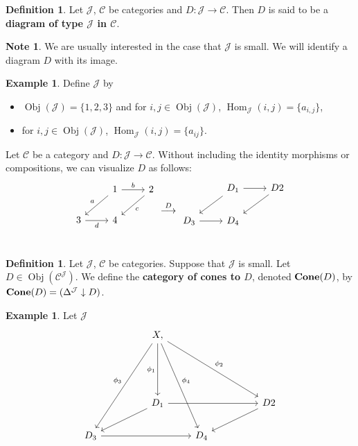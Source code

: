 \documentclass[12pt]{amsart}
\theoremstyle{definition}
\newtheorem{defn}[definition]{Definition}
\newtheorem{note}[definition]{Note}
\newtheorem{exmp}[definition]{Example}
\newcommand{\Del}{\Delta}
\newcommand{\MC}{\mathcal{C}}
\newcommand{\MJ}{\mathcal{J}}
\newcommand{\tbf}[1]{\textbf{#1}}
\DeclareMathOperator{\Obj}{Obj}
\DeclareMathOperator{\Hom}{Hom}
\DeclareMathOperator*{\0}{\mbf{0}}
\DeclareMathOperator*{\1}{\mbf{1}}
\DeclareMathOperator*{\Cone}{\text{\tbf{Cone}}}
\begin{document}
	\begin{defn}
		Let $\MJ$, $\MC$ be categories and $D: \MJ \rightarrow \MC$. Then $D$ is said to be a \textbf{diagram of type $\MJ$ in $\MC$}.
	\end{defn}

	\begin{note}
		We are usually interested in the case that $\MJ$ is small. We will identify a diagram $D$ with its image. 
	\end{note}

	\begin{exmp}
		Define $\MJ$ by
		\begin{itemize}
			\item  $\Obj(\MJ) = \{1, 2, 3\}$ and for $i,j \in \Obj(\MJ)$, $\Hom_{\MJ}(i, j) = \{a_{i,j}\}$,
			\item for $i,j \in \Obj(\MJ)$, $\Hom_{\MJ}(i,j) = \{a_{ij}\}$.
		\end{itemize}
		Let $\MC$ be a category and $D: \MJ \rightarrow \MC$. Without including the identity morphisms or compositions, we can visualize $D$ as follows:
		\[
		\begin{tikzcd}
			&     1  \arrow[dl, "a"'] \arrow[r, "b"]        &  2 \arrow[dl, "c"] \\
			3 \arrow[r, "d"'] &        4   & \\
		\end{tikzcd}
		\overset{D}{\longrightarrow}
		\begin{tikzcd}
			&     D_1  \arrow[dl] \arrow[r]        &  D2 \arrow[dl] \\
			D_3 \arrow[r] &        D_4   & \\
		\end{tikzcd}
		\]
	\end{exmp}

	\begin{defn}
		Let $\MJ$, $\MC$ be categories. Suppose that $\MJ$ is small. Let $D \in \Obj(\MC^{\MJ})$. We define the \textbf{category of cones to $D$}, denoted $\Cone(D)$, by $\Cone(D) = (\Del^{\MJ} \downarrow D)$.
	\end{defn}


	\begin{exmp}
		Let $\MJ$
		\[
		\begin{tikzcd}
			&  &  X \arrow[ddd, "\phi_1"'] \arrow[ddddll, "\phi_3"']  \arrow[dddrrr, "\phi_2"], \arrow[ddddr, "\phi_4"] &       &    \\
			&       &     &       &    \\
			&       &     &       &    \\
			&       &  D_1  \arrow[dll] \arrow[rrr]    &       & &  D2 \arrow[dll] \\
			D_3 \arrow[rrr] &       &     &  D_4  &    \\
		\end{tikzcd}
		\]
	\end{exmp}
	
\end{document}

